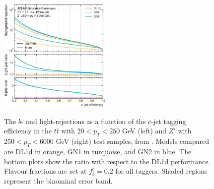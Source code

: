 \begin{center}
\begin{figure}[h!]
{  \includegraphics[width=0.48\textwidth]{Images/FTAG/GN/GN2/ROCpublic/zpc.png}
  }
  \caption{The $b$- and light-rejections as a function of the $c$-jet tagging efficiency in the $t\bar{t}$ with $20 < p_T < 250$ GeV (left) and $Z'$ with $250 < p_T < 6000$ GeV (right) test samples, from \cite{ATL-PLOT-FTAG-2023-01}. Models compared are DL1d in orange, GN1 in turquoise, and GN2 in blue. The bottom plots show the ratio with respect to the DL1d performance. Flavour fractions are set at $f^c_b = 0.2$ for all taggers. Shaded regions represent the binominal error band.}
  \label{apfig:GN2rocc}
  \end{figure}
\end{center}
\vspace*{\fill}

\clearpage

